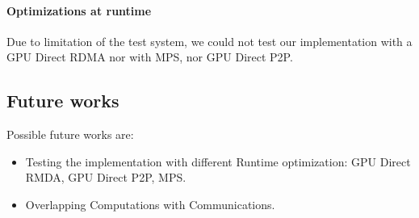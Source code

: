 \documentclass[article]{scrartcl}
\begin{document}
\paragraph{Optimizations at runtime}
Due to limitation of the test system, we could not test our implementation with a GPU Direct RDMA nor with MPS, nor GPU Direct P2P.   

\subsection{Future works}
Possible future works are:
\begin{itemize}
	\item Testing the implementation with different Runtime optimization: GPU Direct RMDA, GPU Direct P2P, MPS.
	\item Overlapping Computations with Communications.
\end{itemize}
\end{document}

